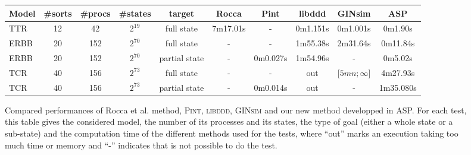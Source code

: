 \begin{figure}[htp]
\begin{center}
\label{tab:reachability}
\noindent%
\begin{tabular}{|l|c|c|c|c||c|c|c|c|c|}
  \hline
   Model&  \#sorts &\#procs & \#states & target & Rocca & Pint & libddd & GINsim & ASP \\
  \hline
  TTR & 12 &42 & $2^{19}$ & full state & 7m17.01s & - & 0m1.151s &  0m1.001s & 0m1.90s \\
  \hline
  ERBB & 20 &152 & $2^{70}$ & full state & - & - &1m55.38s & 2m31.64s & 0m11.84s \\
  \hline
  ERBB & 20 &152 & $2^{70}$ & partial state & - & 0m0.027s &1m54.96s & - & 0m5.02s \\
  \hline
  TCR & 40 &156 & $2^{73}$ & full state & - & - & out & $ \lbrack 5mn ; \infty \rbrack$ & 4m27.93s \\
  \hline
   TCR & 40 &156 & $2^{73}$ & partial state & - & 0m0.014s & out & - & 1m35.080s \\
  \hline
\end{tabular}
\caption{Compared performances of Rocca et al. method, \textsc{Pint}, \textsc{libddd}, \textsc{GINsim} and our new method developped in ASP.
For each test, this table gives the considered model,
the number of its processes and its states, the type of goal
(either a whole state or a sub-state)
and the computation time of the different methods used for the tests,
where “out” marks an execution taking too much time or memory
and “-” indicates that is not possible to do the test.
}
\end{center}
\end{figure}

 
 

 

